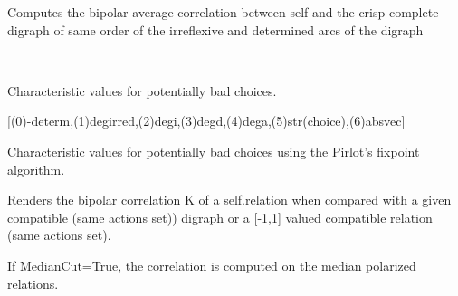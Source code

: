 \documentclass[letterpaper,10pt,english]{sphinxmanual}
\begin{document}
\begin{fulllineitems}

\begin{fulllineitems}
\label{techDoc:digraphs.Digraph.computeAverageValuation}
Computes the bipolar average correlation between
self and the crisp complete digraph of same order
of the irreflexive and determined arcs of the digraph

\end{fulllineitems}


\begin{fulllineitems}
\label{techDoc:digraphs.Digraph.computeBadChoices}~
\begin{DUlineblock}{0em}
\item[] Characteristic values for potentially bad choices.
\item[] {[}(0)-determ,(1)degirred,(2)degi,(3)degd,(4)dega,(5)str(choice),(6)absvec{]}
\end{DUlineblock}

\end{fulllineitems}


\begin{fulllineitems}
\label{techDoc:digraphs.Digraph.computeBadPirlotChoices}
Characteristic values for potentially bad choices
using the Pirlot's fixpoint algorithm.

\end{fulllineitems}


\begin{fulllineitems}
\label{techDoc:digraphs.Digraph.computeBipolarCorrelation}
Renders the bipolar correlation K of a
self.relation when compared
with a given compatible (same actions set)) digraph or
a {[}-1,1{]} valued compatible relation (same actions set).

If MedianCut=True, the correlation is computed on the median polarized relations.


\end{fulllineitems}
\end{fulllineitems}
\end{document}

